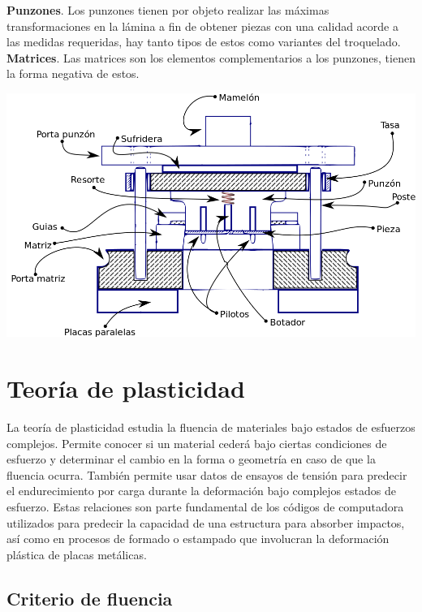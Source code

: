 \textbf{Punzones}. Los punzones tienen por objeto realizar las máximas transformaciones en la lámina 
a fin de obtener piezas con una calidad acorde a las medidas requeridas, hay tanto tipos de estos 
como variantes del troquelado.\\

\textbf{Matrices}. Las matrices son los elementos complementarios a los punzones, tienen la forma 
negativa de estos.

\begin{center}
\includegraphics[scale=0.3]{src/ch2/componentes_troquel.png}
\label{fig:componentes_troquel}
\end{center}


\section{Teoría de plasticidad}

La teoría de plasticidad estudia la fluencia de materiales bajo estados de esfuerzos complejos. Permite 
conocer si un material cederá bajo ciertas condiciones de esfuerzo y determinar el cambio en la forma o 
geometría en caso de que la fluencia ocurra. También permite usar datos de ensayos de tensión para predecir 
el endurecimiento por carga durante la deformación bajo complejos estados de esfuerzo. Estas relaciones 
son parte fundamental de los códigos de computadora utilizados para predecir la capacidad de una estructura 
para absorber impactos, así como en procesos de formado o estampado que involucran la deformación plástica de 
placas metálicas.

\subsection{Criterio de fluencia}

